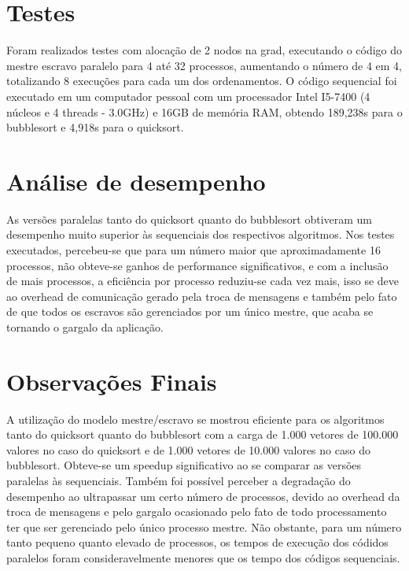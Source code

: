 \documentclass{article}
\begin{document}
\begin{multicols*}{2}
\section{Testes}
Foram realizados testes com alocação de 2 nodos na grad, executando o código do mestre escravo paralelo para 4 até 32 processos, aumentando o número de 4 em 4, totalizando 8 execuções para cada um dos ordenamentos. O código sequencial foi executado em um computador pessoal com um processador Intel I5-7400 (4 núcleos e 4 threads - 3.0GHz) e 16GB de memória RAM, obtendo 189,238s para o bubblesort e 4,918s para o quicksort.

\section{Análise de desempenho}
As versões paralelas tanto do quicksort quanto do bubblesort obtiveram um desempenho muito superior às sequenciais dos respectivos algoritmos. Nos testes executados, percebeu-se que para um número maior que aproximadamente 16 processos, não obteve-se ganhos de performance significativos, e com a inclusão de mais processos, a eficiência por processo reduziu-se cada vez mais, isso se deve ao overhead de comunicação gerado pela troca de mensagens e também pelo fato de que todos os escravos são gerenciados por um único mestre, que acaba se tornando o gargalo da aplicação.

\section{Observações Finais}
A utilização do modelo mestre/escravo se mostrou eficiente para os algoritmos tanto do quicksort quanto do bubblesort com a carga de 1.000 vetores de 100.000 valores no caso do quicksort e de 1.000 vetores de 10.000 valores no caso do bubblesort. Obteve-se um speedup significativo ao se comparar as versões paralelas às sequenciais. Também foi possível perceber a degradação do desempenho ao ultrapassar um certo número de processos, devido ao overhead da troca de mensagens e pelo gargalo ocasionado pelo fato de todo processamento ter que ser gerenciado pelo único processo mestre. Não obstante, para um número tanto pequeno quanto elevado de processos, os tempos de execução dos códidos paralelos foram consideravelmente menores que os tempo dos códigos sequenciais.

\end{multicols*}

\newpage
\end{document}

